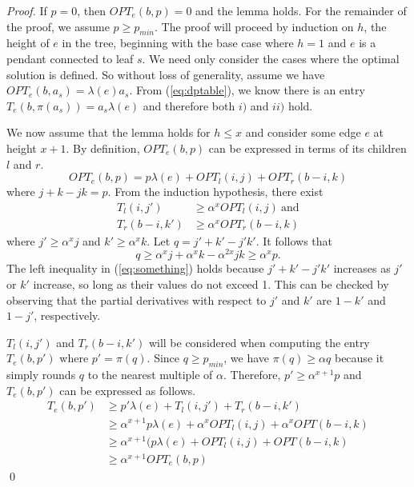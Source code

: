 \documentclass[10pt]{llncs}       \usepackage{graphicx,subfigure}
\begin{document}
\begin{proof}
If $p=0$, then $OPT_e(b,p) = 0$ and the lemma holds.  For the remainder of the
proof, we assume $p \geq p_{min}$.  
The proof will proceed by induction on $h$, the height of $e$ in the tree,
beginning with the base case where $h=1$ and $e$ is a pendant connected to
leaf $s$.  We need only consider the cases where the optimal solution is
defined. So without loss of generality, assume we have $OPT_e(b,a_s) = 
\lambda(e)a_s$. From (\ref{eq:dptable}), we know there is an entry 
$T_e(b,\pi(a_s)) = a_s\lambda(e)$ and therefore both $i)$ and $ii)$ hold.

We now assume that the lemma holds for $h \leq x$ and consider some edge $e$
at height $x+1$. By definition, $OPT_e(b,p)$ can be expressed in terms of its
children $l$ and $r$.
\begin{equation*}
  OPT_e(b,p) = p \lambda(e) + OPT_l(i,j) + OPT_r(b-i,k)
\end{equation*}
where $j+k-jk=p$. From the induction hypothesis, there exist
\begin{align*}
  T_l(i,j') &\geq \alpha^xOPT_l(i,j) ~\text{and}\\
  T_r(b-i,k') &\geq \alpha^xOPT_r(b-i,k)
\end{align*}
where $j' \geq \alpha^xj$ and $k' \geq \alpha^xk$.  Let $q = j' + k' -j'k'$.
It follows that
\begin{equation}
  \label{eq:something}
q \geq \alpha^x j + \alpha^x k - \alpha^{2x}jk \geq \alpha^xp. 
\end{equation}
The left inequality in (\ref{eq:something}) 
holds because $j' + k' - j'k'$ increases
as $j'$ or $k'$ increase, so long as their values do not exceed 1. This
can be
 checked by observing that the partial derivatives with respect to $j'$ and
$k'$ are $1-k'$ and $1-j'$, respectively.

$T_l(i,j')$ and $T_r(b-i,k')$ will be considered when computing the entry
$T_e(b,p')$ where $p' = \pi(q)$. Since $q \geq p_{min}$, we have
 $\pi(q) \geq 
\alpha q$ because it simply rounds $q$ to the nearest multiple of $\alpha$. 
Therefore, $p' \geq \alpha^{x+1}p$ and $T_e(b,p')$ can  be expressed as follows.
\begin{align*}
  T_e(b,p') &\geq p' \lambda(e) +  T_l(i,j') + T_r(b-i,k')\\
  & \geq \alpha^{x+1}p \lambda(e) + \alpha^x OPT_l(i,j) + \alpha^x OPT(b-i,k)\\
  & \geq \alpha^{x+1}(p \lambda(e) + OPT_l(i,j) + OPT(b-i,k)\\
  & \geq \alpha^{x+1} OPT_e(b,p)
\end{align*}\qed
\end{proof}
\end{document}

